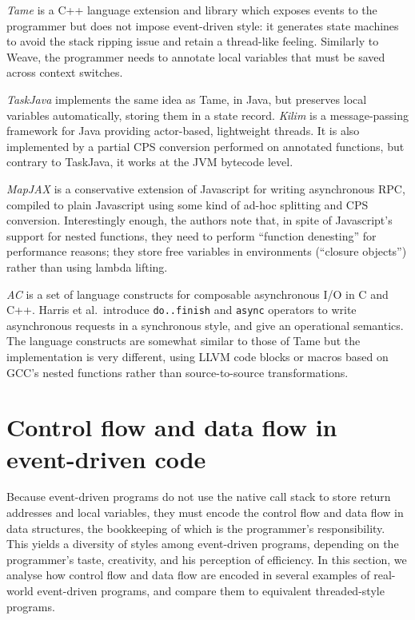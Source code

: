 \documentclass[a4paper]{llncs}
\begin{document}
\emph{Tame} \cite{DBLP:conf/usenix/KrohnKK07} is a C++ language extension and
library which exposes events to the programmer but does not impose event-driven
style: it generates state machines to avoid the stack ripping issue and retain a
thread-like feeling.  Similarly to Weave, the programmer needs to annotate local
variables that must be saved across context switches.

\emph{TaskJava} \cite{DBLP:conf/pepm/FischerMM07} implements the same idea as
Tame, in Java, but preserves local variables automatically, storing them in a
state record.  \emph{Kilim} \cite{DBLP:conf/ecoop/SrinivasanM08} is a
message-passing framework for Java providing actor-based, lightweight threads.
It is also implemented by a partial CPS conversion performed on annotated
functions, but contrary to TaskJava, it works at the JVM bytecode level.

\emph{MapJAX} \cite{DBLP:conf/usenix/MyersCCL07} is a conservative extension of
Javascript for writing asynchronous RPC, compiled to plain Javascript using some
kind of ad-hoc splitting and CPS conversion.  Interestingly enough, the authors
note that, in spite of Javascript's support for nested functions, they need to
perform ``function denesting'' for performance reasons; they store free
variables in environments (``closure objects'') rather than using
lambda lifting.

\emph{AC} \cite{DBLP:conf/oopsla/HarrisAIM11} is a set of language constructs
for composable asynchronous I/O in C and C++.  Harris et al.\ introduce
\texttt{do..finish} and \texttt{async} operators to write asynchronous requests
in a synchronous style, and give an operational semantics.  The language
constructs are somewhat similar to those of Tame but the implementation is very
different, using LLVM code blocks or macros based on GCC's nested functions
rather than source-to-source transformations.

\section{Control flow and data flow in event-driven code}
\label{sec:flow}

Because event-driven programs do not use the native call stack to store return
addresses and local variables, they must encode the control flow and data flow
in data structures, the bookkeeping of which is the programmer's responsibility.
This yields a diversity of styles among event-driven programs, depending on the
programmer's taste, creativity, and his perception of efficiency.  In this
section, we analyse how control flow and data flow are encoded in several
examples of real-world event-driven programs, and compare them to equivalent
threaded-style programs.
\end{document}
